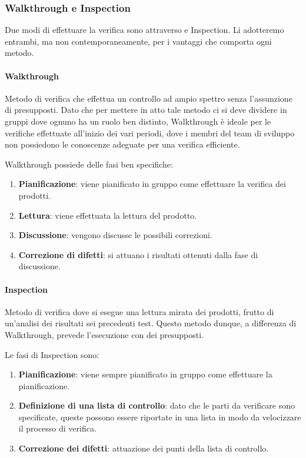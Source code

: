 		\subsubsection{Walkthrough e Inspection}
		Due modi di effettuare la verifica sono attraverso  e Inspection.
		Li adotteremo entrambi, ma non contemporaneamente, per i vantaggi che comporta ogni metodo.

			\paragraph{Walkthrough}
			Metodo di verifica che effettua un controllo ad ampio spettro senza l’assunzione di presupposti. Dato che per mettere in atto tale metodo ci
			si deve dividere in gruppi dove ognuno ha un ruolo ben distinto, Walkthrough è ideale per le verifiche effettuate all'inizio dei vari periodi,
			dove i membri del team di sviluppo non possiedono le conoscenze adeguate per una verifica efficiente.

			Walkthrough possiede delle fasi ben specifiche:

			\begin{enumerate}
				\item \textbf{Pianificazione}: viene pianificato in gruppo come effettuare la verifica dei prodotti.
				\item \textbf{Lettura}: viene effettuata la lettura del prodotto.
				\item \textbf{Discussione}: vengono discusse le possibili correzioni.
				\item \textbf{Correzione di difetti}: si attuano i risultati ottenuti dalla fase di discussione.
			\end{enumerate}

			\paragraph{Inspection}
			Metodo di verifica dove si esegue una lettura mirata dei prodotti, frutto di un'analisi dei risultati sei precedenti test.
			Questo metodo dunque, a differenza di Walkthrough, prevede l'esecuzione con dei presupposti.
	
			Le fasi di Inspection sono:
	
			\begin{enumerate}
				\item \textbf{Pianificazione}: viene sempre pianificato in gruppo come effettuare la pianificazione.
				\item \textbf{Definizione di una lista di controllo}: dato che le parti da verificare sono specificate, queste possono essere
				riportate in una lista in modo da velocizzare il processo di verifica.
				\item \textbf{Correzione dei difetti}: attuazione dei punti della lista di controllo.
			\end{enumerate}
	
